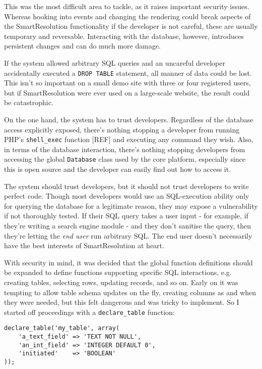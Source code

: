 This was the most difficult area to tackle, as it raises important security issues. Whereas hooking into events and changing the rendering could break aspects of the SmartResolution functionality if the developer is not careful, these are usually temporary and reversable. Interacting with the database, however, introduces persistent changes and can do much more damage.

If the system allowed arbitrary SQL queries and an uncareful developer accidentally executed a \lstinline{DROP TABLE} statement, all manner of data could be lost. This isn't so important on a small demo site with three or four registered users, but if SmartResolution were ever used on a large-scale website, the result could be catastrophic.

On the one hand, the system has to trust developers. Regardless of the database access explicitly exposed, there's nothing stopping a developer from running PHP's \lstinline{shell_exec} function [REF] and executing any command they wish. Also, in terms of the database interaction, there's nothing stopping developers from accessing the global \lstinline{Database} class used by the core platform, especially since this is open source and the developer can easily find out how to access it.

The system should trust developers, but it should not trust developers to write perfect code. Though most developers would use an SQL-execution ability only for querying the database for a legitimate reason, they may expose a vulnerability if not thoroughly tested. If their SQL query takes a user input - for example, if they're writing a search engine module - and they don't sanitise the query, then they're letting the \emph{end user} run arbitrary SQL. The end user doesn't necessarily have the best interests of SmartResolution at heart.

With security in mind, it was decided that the global function definitions should be expanded to define functions supporting specific SQL interactions, e.g. creating tables, selecting rows, updating records, and so on. Early on it was tempting to allow table schema updates on the fly, creating columns as and when they were needed, but this felt dangerous and was tricky to implement. So I started off proceedings with a \lstinline{declare_table} function:

\begin{lstlisting}
declare_table('my_table', array(
    'a_text_field' => 'TEXT NOT NULL',
    'an_int_field' => 'INTEGER DEFAULT 0',
    'initiated'    => 'BOOLEAN'
));
\end{lstlisting}

